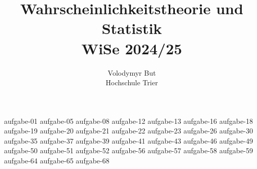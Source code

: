 \documentclass[10pt, oneside]{article}
\title{Wahrscheinlichkeitstheorie und Statistik\\[10pt]\Large{WiSe 2024/25}}
\author{Volodymyr But\\[10pt]Hochschule Trier}
\date{}
\begin{document}
\maketitle
\vspace{25px}

{aufgabe-01}
\pagebreak
{aufgabe-05}
\pagebreak
{aufgabe-08}
\pagebreak
{aufgabe-12}
\pagebreak
{aufgabe-13}
{aufgabe-16}
{aufgabe-18}
\pagebreak
{aufgabe-19}
{aufgabe-20}
\vspace{5px}
{aufgabe-21}
{aufgabe-22}
{aufgabe-23}
{aufgabe-26}
{aufgabe-30}
{aufgabe-35}
{aufgabe-37}
{aufgabe-39}
\vspace{5px}
{aufgabe-41}
{aufgabe-43}
\pagebreak
{aufgabe-46}
\pagebreak
{aufgabe-49}
{aufgabe-50}
{aufgabe-51}
\pagebreak
{aufgabe-52}
{aufgabe-56}
{aufgabe-57}
{aufgabe-58}
{aufgabe-59}
{aufgabe-64}
\pagebreak
{aufgabe-65}
\pagebreak
{aufgabe-68}
\end{document}
